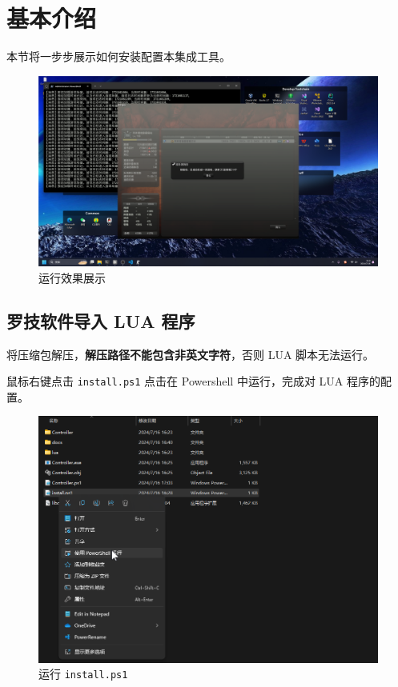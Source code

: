 \section{基本介绍}

本节将一步步展示如何安装配置本集成工具。

\begin{figure}[H]
    \Centering
    \includegraphics[width=\textwidth]{docs/assets/controller.png}
    \caption{运行效果展示}
\end{figure}

\subsection{罗技软件导入 LUA 程序}

将压缩包解压，\textbf{解压路径不能包含非英文字符}，否则 LUA 脚本无法运行。

鼠标右键点击 \lstinline{install.ps1} 点击在 Powershell 中运行，完成对 LUA 程序的配置。

\begin{figure}[H]
    \Centering
    \includegraphics[width=\textwidth]{docs/assets/install.png}
    \caption{运行 \lstinline{install.ps1}}
\end{figure}

